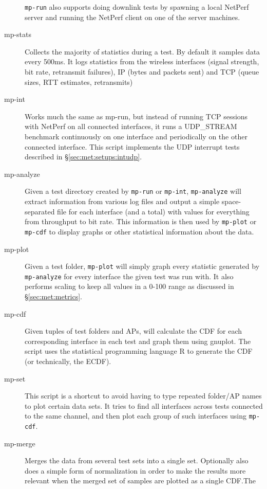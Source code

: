 \begin{description}
    \texttt{mp-run} also supports doing downlink tests by spawning a local
    NetPerf server and running the NetPerf client on one of the server machines.
  \item[mp-stats]
    Collects the majority of statistics during a test. By default it samples
    data every 500ms. It logs statistics from the wireless interfaces (signal
    strength, bit rate, retransmit failures), IP (bytes and packets sent) and
    TCP (queue sizes, RTT estimates, retransmits)
  \item[mp-int]
    Works much the same as mp-run, but instead of running TCP sessions with
    NetPerf on all connected interfaces, it runs a UDP\_STREAM benchmark
    continuously on one interface and periodically on the other connected
    interface. This script implements the UDP interrupt tests described in
    \S\ref{sec:met:setups:intudp}.
  \item[mp-analyze]
    Given a test directory created by \texttt{mp-run} or \texttt{mp-int},
    \texttt{mp-analyze} will extract information from various log files and
    output a simple space-separated file for each interface (and a total) with
    values for everything from throughput to bit rate. This information is then
    used by \texttt{mp-plot} or \texttt{mp-cdf} to display graphs or other
    statistical information about the data.
  \item[mp-plot]
    Given a test folder, \texttt{mp-plot} will simply graph every statistic
    generated by \texttt{mp-analyze} for every interface the given test was run
    with. It also performs scaling to keep all values in a 0-100 range as
    discussed in \S\ref{sec:met:metrics}.
  \item[mp-cdf]
    Given tuples of test folders and APs, will calculate the CDF for each
    corresponding interface in each test and graph them using gnuplot. The
    script uses the statistical programming language R to generate the CDF (or
    technically, the ECDF).
  \item[mp-set]
    This script is a shortcut to avoid having to type repeated folder/AP names
    to plot certain data sets. It tries to find all interfaces across tests
    connected to the same channel, and then plot each group of such interfaces
    using \texttt{mp-cdf}.
  \item[mp-merge]
    Merges the data from several test sets into a single set. Optionally also
    does a simple form of normalization in order to make the results more
    relevant when the merged set of samples are plotted as a single CDF.\@ The

\end{description}
